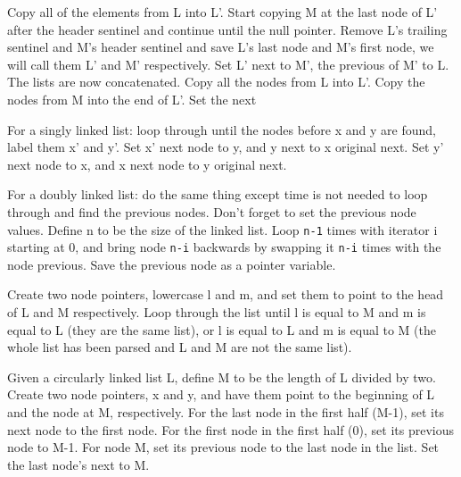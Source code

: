 Copy all of the elements from L into L'.  Start copying M at the last node of L' after the header sentinel and continue until the null pointer.
Remove L's trailing sentinel and M's header sentinel and save L's last node and M's first node, we will call them L' and M' respectively.  Set L' next to M', the previous of M' to L.  The lists are now concatenated.
Copy all the nodes from L into L'.  Copy the nodes from M into the end of L'.  Set the next 

For a singly linked list: loop through until the nodes before x and y are found, label them x' and y'.  Set x' next node to y, and y next to x original next.  Set y' next node to x, and x next node to y original next.

For a doubly linked list: do the same thing except time is not needed to loop through and find the previous nodes.  Don't forget to set the previous node values.
Define n to be the size of the linked list.  Loop \texttt{n-1} times with iterator i starting at 0, and bring node \texttt{n-i} backwards by swapping it \texttt{n-i} times with the node previous.  Save the previous node as a pointer variable.


Create two node pointers, lowercase l and m, and set them to point to the head of L and M respectively.  Loop through the list until l is equal to M and m is equal to L (they are the same list), or l is equal to L and m is equal to M (the whole list has been parsed and L and M are not the same list).


Given a circularly linked list L, define M to be the length of L divided by two.
Create two node pointers, x and y, and have them point to the beginning of L and the node at M, respectively.  For the last node in the first half (M-1), set its next node to the first node.  For the first node in the first half (0), set its previous node to M-1.  For node M, set its previous node to the last node in the list.  Set the last node's next to M.